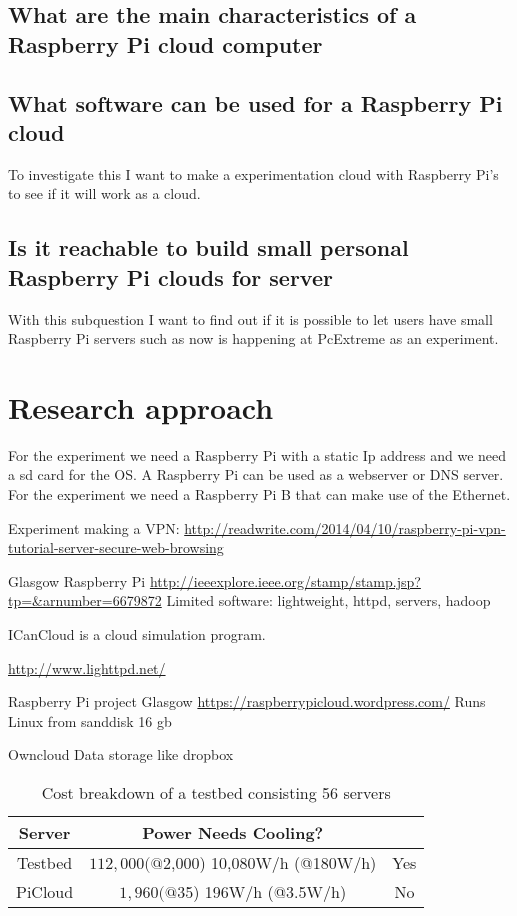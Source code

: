 \documentclass{sig-alternate-br}
\begin{document}
\subsection{What are the main characteristics of a Raspberry Pi cloud computer}

\subsection{What software can be used for a Raspberry Pi cloud}
To investigate this I want to make a experimentation cloud with Raspberry Pi's to see if it will work as a cloud. 

\subsection{Is it reachable to build small personal Raspberry Pi clouds for server}
With this subquestion I want to find out if it is possible to let users have small Raspberry Pi servers such as now is happening at PcExtreme as an experiment. 


\section{Research approach}
For the experiment we need a Raspberry Pi with a static Ip address and we need a sd card for the OS.  A Raspberry Pi can be used as a webserver or DNS server. For the experiment we need a Raspberry Pi B that can make use of the Ethernet.

Experiment making a VPN:
\url{http://readwrite.com/2014/04/10/raspberry-pi-vpn-tutorial-server-secure-web-browsing}

Glasgow Raspberry Pi
\url{http://ieeexplore.ieee.org/stamp/stamp.jsp?tp=&arnumber=6679872}
Limited software:
lightweight,
httpd,
servers, 
hadoop

ICanCloud is a cloud simulation program.


\url{http://www.lighttpd.net/}

Raspberry Pi project Glasgow
\url{https://raspberrypicloud.wordpress.com/}
Runs Linux from sanddisk 16 gb

Owncloud
Data storage like dropbox

\begin{table}
	\centering \caption{Cost breakdown of a testbed consisting 56 servers} 

\begin{tabular}{|c|c|c|} \hline
\textbf{Server}&  \textbf{Power} \textbf{Needs Cooling?} \\ \hline
Testbed  & $112,000 (@$2,000) 10,080W/h (@180W/h) & Yes \\ \hline
PiCloud & $1,960 (@$35) 196W/h (@3.5W/h) & No \\ \hline
\end{tabular}
\label{tab:cost}
\end{table}
\end{document}
